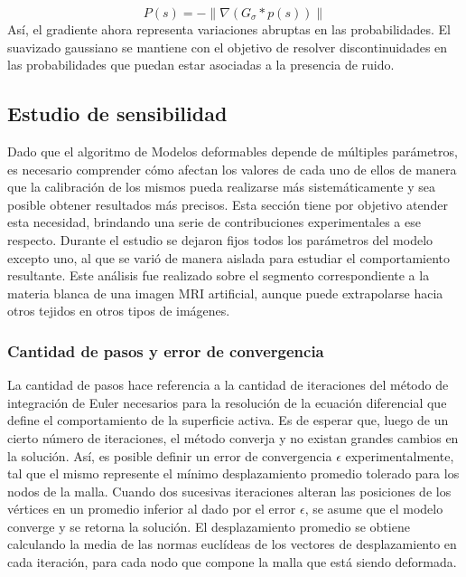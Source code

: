 %
\begin{equation}
P(s) = - \left\| \nabla(G_{\sigma} * p(s)) \right\|
\end{equation}
%
Así, el gradiente ahora representa variaciones abruptas en las probabilidades. El suavizado gaussiano se mantiene con el objetivo de resolver discontinuidades en las probabilidades que puedan estar asociadas a la presencia de ruido.

\subsection{Estudio de sensibilidad}\label{section:estudio_de_sensibilidad}
Dado que el algoritmo de Modelos deformables depende de múltiples parámetros, es necesario comprender cómo afectan los valores de cada uno de ellos de manera que la calibración de los mismos pueda realizarse más sistemáticamente y sea posible obtener resultados más precisos. Esta sección tiene por objetivo atender esta necesidad, brindando una serie de contribuciones experimentales a ese respecto. Durante el estudio se dejaron fijos todos los parámetros del modelo excepto uno, al que se varió de manera aislada para estudiar el comportamiento resultante. Este análisis fue realizado sobre el segmento correspondiente a la materia blanca de una imagen MRI artificial, aunque puede extrapolarse hacia otros tejidos en otros tipos de imágenes.

\subsubsection{Cantidad de pasos y error de convergencia}
La cantidad de pasos hace referencia a la cantidad de iteraciones del método de integración de Euler necesarios para la resolución de la ecuación diferencial que define el comportamiento de la superficie activa. Es de esperar que, luego de un cierto número de iteraciones, el método converja y no existan grandes cambios en la solución. Así, es posible definir un error de convergencia $\epsilon$ experimentalmente, tal que el mismo represente el mínimo desplazamiento promedio tolerado para los nodos de la malla. Cuando dos sucesivas iteraciones alteran las posiciones de los vértices en un promedio inferior al dado por el error $\epsilon$, se asume que el modelo converge y se retorna la solución. El desplazamiento promedio se obtiene calculando la media de las normas euclídeas de los vectores de desplazamiento en cada iteración, para cada nodo que compone la malla que está siendo deformada.

